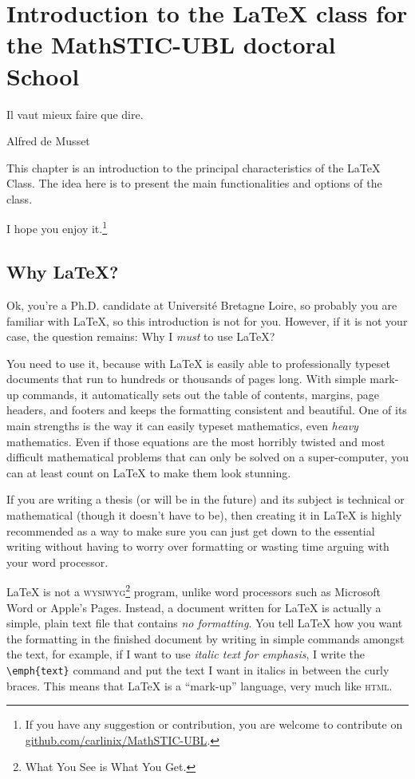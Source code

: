 \chapter{Introduction to the \LaTeX{} class for the MathSTIC-UBL doctoral School}\label{chap:intro}

\epigraph{Il vaut mieux faire que dire.}{Alfred de Musset}
\minitoc%

This chapter is an introduction to the principal characteristics of the \urmstic{} \LaTeX{} Class. 
The idea here is to present the main functionalities and options of the class.


I hope you enjoy it.\footnote{If you have any suggestion or contribution, you are welcome to contribute on \url{github.com/carlinix/MathSTIC-UBL}.}

\section{Why \LaTeX?}\label{sec:why}
Ok, you're a Ph.D. candidate at Université Bretagne Loire, so probably you are familiar with \LaTeX{}, so this introduction is not for you.
However,  if it is not your case, the question remains: Why I \emph{must} to use \LaTeX?

You need to use it, because with \LaTeX{} is easily able to professionally typeset documents that run to hundreds or thousands of pages long. 
With simple mark-up commands, it automatically sets out the table of contents, margins, page headers, and footers and keeps the formatting consistent and beautiful. 
One of its main strengths is the way it can easily typeset mathematics, even \emph{heavy} mathematics. 
Even if those equations are the most horribly twisted and most difficult mathematical problems that can only be solved on a super-computer, you can at least count on \LaTeX{} to make them look stunning.

If you are writing a thesis (or will be in the future) and its subject is technical or mathematical (though it doesn't have to be), then creating it in \LaTeX{} is highly recommended as a way to make sure you can just get down to the essential writing without having to worry over formatting or wasting time arguing with your word processor.

\LaTeX{} is not a \textsc{wysiwyg}\footnote{What You See is What You Get.} program, unlike word processors such as Microsoft Word or Apple's Pages. 
Instead, a document written for \LaTeX{} is actually a simple, plain text file that contains \emph{no formatting}. 
You tell \LaTeX{} how you want the formatting in the finished document by writing in simple commands amongst the text, for example, if I want to use \emph{italic text for emphasis}, I write the \verb|\emph{text}| command and put the text I want in italics in between the curly braces. 
This means that \LaTeX{} is a \enquote{mark-up} language, very much like \textsc{html}.

